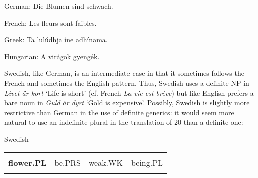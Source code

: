 \begin{styleExLtrTblii}
German: Die Blumen sind schwach.

\end{styleExLtrTblii}

\begin{styleExLtrTblii}
French: Les fleurs sont faibles.

\end{styleExLtrTblii}

\begin{styleExLtrTblii}
Greek: Ta lulúdhja íne adhínama.

\end{styleExLtrTblii}

\begin{styleExLtrTblii}
Hungarian: A virágok gyengék.

\end{styleExLtrTblii}

\begin{styleBodyTextFirst}
Swedish, like German, is an intermediate case in that it sometimes follows the French and sometimes the English pattern. Thus, Swedish uses a definite NP in \textit{Livet är kort} ‘Life is short’ (cf. French \textit{La vie est brève}) but like English prefers a bare noun in \textit{Guld är dyrt} ‘Gold is expensive’. Possibly, Swedish is slightly more restrictive than German in the use of definite generics: it would seem more natural to use an indefinite plural in the translation of 20 than a definite one:

\end{styleBodyTextFirst}


\begin{listWWNumileveli}
\item 

\begin{styleExample}
Swedish

\end{styleExample}

\end{listWWNumileveli}

\begin{tabular}{llll}
\lsptoprule
\multicolumn{4}{l}{{\bfseries Blommor}

}\\
{\bfseries flower.PL} & be.PRS & weak.WK & being.PL\\
\lspbottomrule
\end{tabular}

